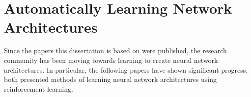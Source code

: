 \documentclass[thesis]{subfiles}
\begin{document}
\section[Automatically Learning Network Architectures]{Automatically Learning Network\\Architectures}
Since the papers this dissertation is based on were published, the research community has been moving towards learning to create neural network architectures. In particular, the following papers have shown significant progress.
\citet{baker2017, zoph2017} both presented methods of learning neural network architectures using reinforcement learning. 
\end{document}
